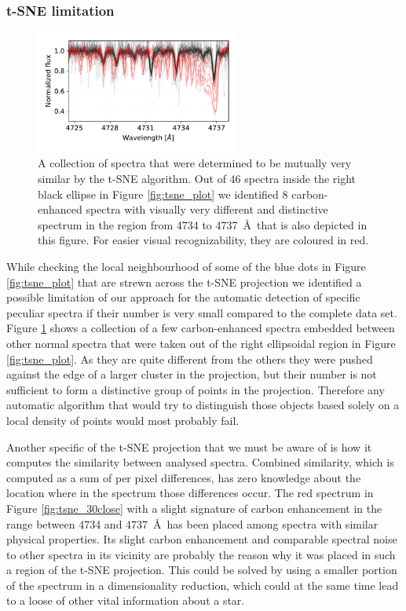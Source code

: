 \subsubsection{t-SNE limitation}
\begin{figure}
	\centering
	\includegraphics[width=0.6\textwidth]{tsne_cemp.pdf}
	\caption{A collection of spectra that were determined to be mutually very similar by the t-SNE algorithm. Out of 46 spectra inside the right black ellipse in Figure \ref{fig:tsne_plot} we identified 8 carbon-enhanced spectra with visually very different and distinctive spectrum in the region from 4734 to 4737~\AA\ that is also depicted in this figure. For easier visual recognizability, they are coloured in red.}
	\label{fig:tsne_cemps}
\end{figure}

While checking the local neighbourhood of some of the blue dots in Figure \ref{fig:tsne_plot} that are strewn across the t-SNE projection we identified a possible limitation of our approach for the automatic detection of specific peculiar spectra if their number is very small compared to the complete data set. Figure \ref{fig:tsne_cemps} shows a collection of a few carbon-enhanced spectra embedded between other normal spectra that were taken out of the right ellipsoidal region in Figure \ref{fig:tsne_plot}. As they are quite different from the others they were pushed against the edge of a larger cluster in the projection, but their number is not sufficient to form a distinctive group of points in the projection. Therefore any automatic algorithm that would try to distinguish those objects based solely on a local density of points would most probably fail.

Another specific of the t-SNE projection that we must be aware of is how it computes the similarity between analysed spectra. Combined similarity, which is computed as a sum of per pixel differences, has zero knowledge about the location where in the spectrum those differences occur. The red spectrum in Figure \ref{fig:tsne_30close} with a slight signature of carbon enhancement in the range between 4734 and 4737~\AA\ has been placed among spectra with similar physical properties. Its slight carbon enhancement and comparable spectral noise to other spectra in its vicinity are probably the reason why it was placed in such a region of the t-SNE projection. This could be solved by using a smaller portion of the spectrum in a dimensionality reduction, which could at the same time lead to a loose of other vital information about a star.

